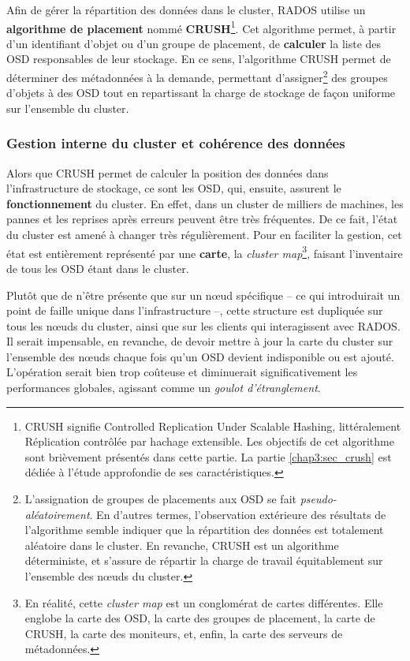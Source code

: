 Afin de gérer la répartition des données dans le cluster, RADOS utilise un \textbf{algorithme de placement} nommé \textbf{CRUSH}\footnote{CRUSH signifie Controlled Replication Under Scalable Hashing, littéralement \og{}Réplication contrôlée par hachage extensible\fg{}. Les objectifs de cet algorithme sont brièvement présentés dans cette partie. La partie \ref{chap3:sec_crush} est dédiée à l'étude approfondie de ses caractéristiques.}. Cet algorithme permet, à partir d'un identifiant d'objet ou d'un groupe de placement, de \textbf{calculer} la liste des OSD responsables de leur stockage. En ce sens, l'algorithme CRUSH permet de déterminer des métadonnées \og{}à la demande\fg{}, permettant d'assigner\footnote{L'assignation de groupes de placements aux OSD se fait \textit{pseudo-aléatoirement}. En d'autres termes, l'observation extérieure des résultats de l'algorithme semble indiquer que la répartition des données est totalement aléatoire dans le cluster. En revanche, CRUSH est un algorithme déterministe, et s'assure de répartir la charge de travail équitablement sur l'ensemble des nœuds du cluster.} des groupes d'objets à des OSD tout en repartissant la charge de stockage de façon uniforme sur l'ensemble du cluster.

\subsubsection{Gestion interne du cluster et cohérence des données}

Alors que CRUSH permet de calculer la position des données dans l'infrastructure de stockage, ce sont les OSD, qui, ensuite, assurent le \textbf{fonctionnement} du cluster. En effet, dans un cluster de milliers de machines, les pannes et les reprises après erreurs peuvent être très fréquentes. De ce fait, l'état du cluster est amené à changer très régulièrement. Pour en faciliter la gestion, cet état est entièrement représenté par une \textbf{carte}, la \emph{cluster map}\footnote{En réalité, cette \emph{cluster map} est un conglomérat de \og{}cartes\fg{} différentes. Elle englobe la carte des OSD, la carte des groupes de placement, la carte de CRUSH, la carte des moniteurs, et, enfin, la carte des serveurs de métadonnées.}, faisant l'inventaire de tous les OSD étant dans le cluster.

Plutôt que de n'être présente que sur un nœud spécifique -- ce qui introduirait un point de faille unique dans l'infrastructure --, cette structure est dupliquée sur tous les nœuds du cluster, ainsi que sur les clients qui interagissent avec RADOS. Il serait impensable, en revanche, de devoir mettre à jour la carte du cluster sur l’ensemble des nœuds chaque fois qu'un OSD devient indisponible ou est ajouté. L'opération serait bien trop coûteuse et diminuerait significativement les performances globales, agissant comme un \textit{goulot d'étranglement}. 

